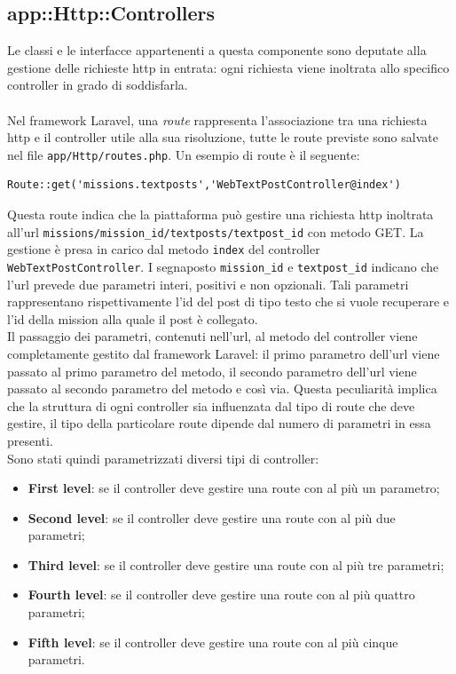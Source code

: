 \subsection{app::Http::Controllers} %

Le classi e le interfacce appartenenti a questa componente sono deputate alla gestione delle richieste \gls{http}\glsfirstoccur{} in entrata: ogni richiesta viene inoltrata allo specifico controller in grado di soddisfarla. 
\\ \\
Nel framework Laravel, una \textit{route} rappresenta l'associazione tra una richiesta \gls{http}\glsfirstoccur{} e il controller utile alla sua risoluzione, tutte le route previste sono salvate nel file \verb!app/Http/routes.php!. 
Un esempio di route è il seguente:

\begin{lstlisting}[frame=none]
Route::get('missions.textposts','WebTextPostController@index')
\end{lstlisting}

Questa route indica che la piattaforma può gestire una richiesta \gls{http}\glsfirstoccur{} inoltrata all'\gls{url}\glsfirstoccur{} \verb!missions/mission_id/textposts/textpost_id! con metodo GET. La gestione è presa in carico dal metodo \verb!index! del controller \verb!WebTextPostController!. I segnaposto \verb!mission_id! e \verb!textpost_id! indicano che l'\gls{url}\glsfirstoccur{} prevede due parametri interi, positivi e non opzionali. Tali parametri rappresentano rispettivamente l'id del post di tipo testo che si vuole recuperare e l'id della mission alla quale il post è collegato. \\
Il passaggio dei parametri, contenuti nell'\gls{url}\glsfirstoccur{}, al metodo del controller viene completamente gestito dal framework Laravel: il primo parametro dell'\gls{url}\glsfirstoccur{} viene passato al primo parametro del metodo, il secondo parametro dell'\gls{url}\glsfirstoccur{} viene passato al secondo parametro del metodo e così via. 
Questa peculiarità implica che la struttura di ogni controller sia influenzata dal tipo di route che deve gestire, il tipo della particolare route dipende dal numero di parametri in essa presenti.\\ 
Sono stati quindi parametrizzati diversi tipi di controller:

\begin{itemize}
	\item \textbf{First level}: se il controller deve gestire una route con al più un parametro;
	\item \textbf{Second level}: se il controller deve gestire una route con al più due parametri;
	\item \textbf{Third level}: se il controller deve gestire una route con al più tre parametri;
	\item \textbf{Fourth level}: se il controller deve gestire una route con al più quattro parametri;
	\item \textbf{Fifth level}: se il controller deve gestire una route con al più cinque parametri.
\end{itemize}

